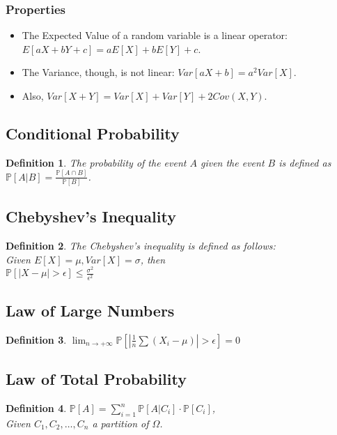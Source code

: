 \documentclass[12pt, a4paper, english]{report}
\newtheorem{definition}{Definition}
\begin{document}
\subsubsection{Properties}
\begin{itemize}
    \item The Expected Value of a random variable is a linear operator: $E[aX + bY + c] = aE[X] + bE[Y] + c$.
    \item The Variance, though, is not linear: $Var[aX + b] = a^{2}Var[X]$.
    \item Also, $Var[X + Y] = Var[X] + Var[Y] + 2Cov(X, Y)$.
\end{itemize}
\subsection{Conditional Probability}
\begin{definition}
    The probability of the event $A$ given the event $B$ is defined as \\$\mathbb{P}[A|B] = \frac{\mathbb{P}[A \cap B]}{\mathbb{P}[B]}$.
\end{definition}
\subsection{Chebyshev's Inequality}
\begin{definition}
    The Chebyshev's inequality is defined as follows:\\
    Given $E[X] = \mu, Var[X] = \sigma$, then \\
    $\mathbb{P}[|X - \mu| > \epsilon] \leq \frac{\sigma^{2}}{\epsilon^{2}}$
\end{definition}
\subsection{Law of Large Numbers}
\begin{definition}
    $\lim_{n \rightarrow + \infty} \mathbb{P}[|\frac{1}{n}\sum (X_{i} - \mu)| > \epsilon] = 0$
\end{definition}
\subsection{Law of Total Probability}
\begin{definition}
    $\mathbb{P}[A] = \sum_{i=1}^{n} \mathbb{P}[A|C_{i}] \cdot \mathbb{P}[C_{i}]$,\\
    Given $C_{1}, C_{2}, \dots , C_{n}$ a partition of $\Omega$.
\end{definition}
\end{document}
